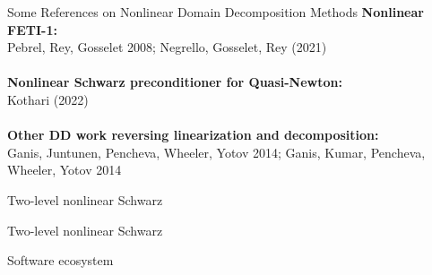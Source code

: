 \begin{frame}{Some References on Nonlinear Domain Decomposition Methods}
	\textbf{Nonlinear FETI-1:}\\
	Pebrel, Rey, Gosselet 2008; Negrello, Gosselet, Rey (2021)\\~\\

    \textbf{Nonlinear Schwarz preconditioner for Quasi-Newton:}\\
    Kothari (2022)\\~\\

	\textbf{Other DD work reversing linearization and decomposition:}\\
	Ganis, Juntunen, Pencheva, Wheeler, Yotov 2014; Ganis, Kumar, Pencheva, Wheeler, Yotov 2014
\end{frame}

\begin{frame}{Two-level nonlinear Schwarz}
	\hspace*{-7mm}
	
\end{frame}

\begin{frame}[noframenumbering]{Two-level nonlinear Schwarz}
	\hspace*{-7mm}
	
\end{frame}

\begin{frame}{Software ecosystem}
	
\end{frame}

